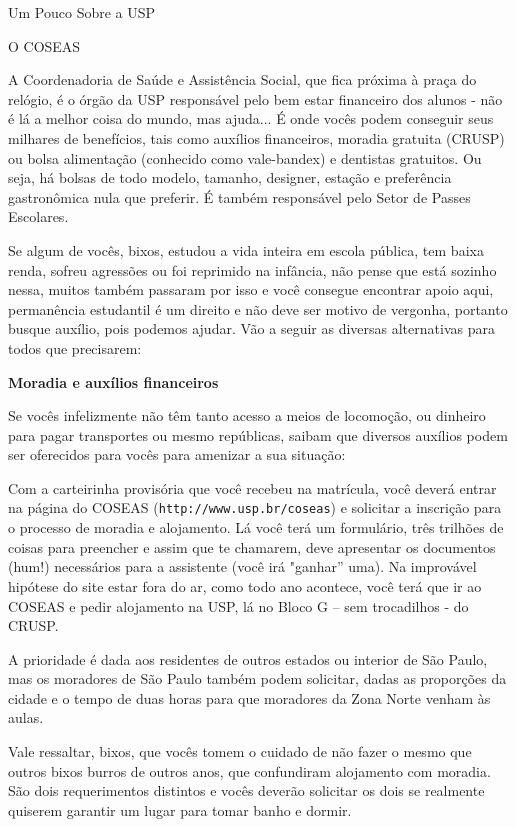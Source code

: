 \begin{secao}{Um Pouco Sobre a USP}
\begin{subsecao}{O COSEAS}

A Coordenadoria de Saúde e Assistência Social, que fica próxima à praça do relógio,
é o órgão da USP responsável pelo bem estar financeiro dos alunos - não é lá a
melhor coisa do mundo, mas ajuda... É onde vocês podem conseguir seus milhares de
benefícios, tais como auxílios financeiros, moradia gratuita (CRUSP) ou bolsa
alimentação (conhecido como vale-bandex) e dentistas gratuitos. Ou seja, há
bolsas de todo modelo, tamanho, designer, estação e preferência gastronômica
nula que preferir. É também responsável pelo Setor de Passes Escolares.

Se algum de vocês, bixos, estudou a vida inteira em escola pública, tem baixa renda,
sofreu agressões ou foi reprimido na infância, não pense que está sozinho nessa,
muitos também passaram por isso e você consegue encontrar apoio aqui, permanência
estudantil é um direito e não deve ser motivo de vergonha, portanto busque auxílio,
pois podemos ajudar. Vão a seguir as diversas alternativas para todos que precisarem:

{\bf Moradia e auxílios financeiros}

Se vocês infelizmente não têm tanto acesso a meios de locomoção, ou dinheiro para
pagar transportes ou mesmo repúblicas, saibam que diversos auxílios podem ser
oferecidos para vocês para amenizar a sua situação:

Com a carteirinha provisória que você recebeu na matrícula, você deverá entrar
na página do COSEAS ({\tt http://www.usp.br/coseas}) e solicitar a inscrição
para o processo de moradia e alojamento. Lá você terá um formulário, três
trilhões de coisas para preencher e assim que te chamarem, deve apresentar os
documentos (hum!) necessários para a assistente (você irá "ganhar” uma). Na
improvável hipótese do site estar fora do ar, como todo ano acontece, você terá
que ir ao COSEAS e pedir alojamento na USP, lá no Bloco G – sem trocadilhos - do
CRUSP.

A prioridade é dada aos residentes de outros estados ou interior de São Paulo,
mas os moradores de São Paulo também podem solicitar, dadas as proporções da
cidade e o tempo de duas horas para que moradores da Zona Norte venham às aulas.

Vale ressaltar, bixos, que vocês tomem o cuidado de não fazer o mesmo que outros
bixos burros de outros anos, que confundiram alojamento com moradia. São dois
requerimentos distintos e vocês deverão solicitar os dois se realmente quiserem
garantir um lugar para tomar banho e dormir.


\end{subsecao}
\end{secao}
